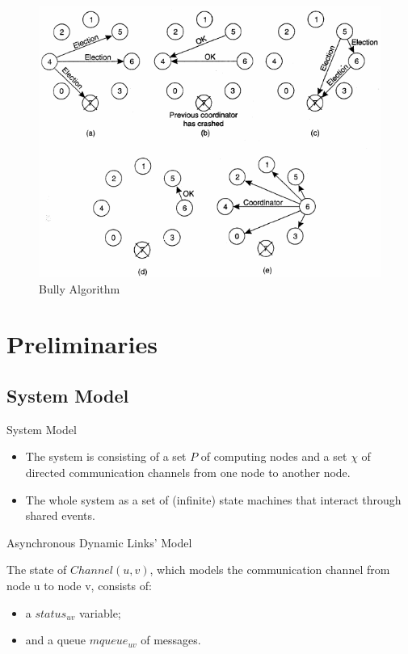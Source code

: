 \documentclass{beamer}
\begin{document}
\begin{frame}
	\begin{figure}
		\centering
		\includegraphics[width=0.7\linewidth]{bully_algorithm}
		\caption{Bully Algorithm}
		\label{fig:bullyalgorithm}
	\end{figure}
\end{frame}
\fi
\section{Preliminaries}
\subsection{System Model}

\begin{frame}{System Model}

\begin{itemize}
	\item The system is consisting of a set $P$ of computing nodes and a set $\chi$ of directed communication channels from one node to another node.
	\item The whole system as a set of (infinite) state machines that interact through shared events.

\end{itemize}

\end{frame}


\begin{frame}{Asynchronous Dynamic Links' Model}

	The state of $Channel(u, v)$, which models the communication channel from node u to node v, consists of:
	\begin{itemize}
		\item a $status_{uv}$ variable;
		\item and a queue $mqueue_{uv}$ of messages.
	\end{itemize}
	 

\end{frame}
\end{document}
